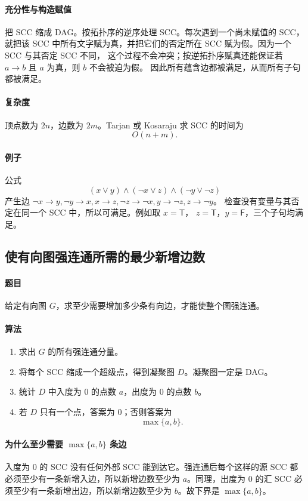 \documentclass[UTF8,openany,12pt]{ctexbook}
\theoremstyle{remark}
\begin{document}
\paragraph{充分性与构造赋值}
把 SCC 缩成 DAG。按拓扑序的逆序处理 SCC。每次遇到一个尚未赋值的 SCC，就把该 SCC
中所有文字赋为真，并把它们的否定所在 SCC 赋为假。因为一个 SCC 与其否定 SCC 不同，
这个过程不会冲突；按逆拓扑序赋真还能保证若 $a\to b$ 且 $a$ 为真，则 $b$ 不会被迫为假。
因此所有蕴含边都被满足，从而所有子句都被满足。

\paragraph{复杂度}
顶点数为 $2n$，边数为 $2m$。Tarjan 或 Kosaraju 求 SCC 的时间为
\[
  O(n+m).
\]

\paragraph{例子}
公式
\[
  (x\vee y)\wedge(\neg x\vee z)\wedge(\neg y\vee \neg z)
\]
产生边 $\neg x\to y,\neg y\to x,x\to z,\neg z\to\neg x,y\to\neg z,z\to\neg y$。
检查没有变量与其否定在同一个 SCC 中，所以可满足。例如取 $x=\mathsf{T}$，
$z=\mathsf{T}$，$y=\mathsf{F}$，三个子句均满足。

\subsection{使有向图强连通所需的最少新增边数}

\paragraph{题目}
给定有向图 $G$，求至少需要增加多少条有向边，才能使整个图强连通。

\paragraph{算法}
\begin{enumerate}
  \item 求出 $G$ 的所有强连通分量。
  \item 将每个 SCC 缩成一个超级点，得到凝聚图 $D$。凝聚图一定是 DAG。
  \item 统计 $D$ 中入度为 $0$ 的点数 $a$，出度为 $0$ 的点数 $b$。
  \item 若 $D$ 只有一个点，答案为 $0$；否则答案为
  \[
    \max\{a,b\}.
  \]
\end{enumerate}

\paragraph{为什么至少需要 $\max\{a,b\}$ 条边}
入度为 $0$ 的 SCC 没有任何外部 SCC 能到达它。强连通后每个这样的源 SCC 都必须至少有一条新增入边，所以新增边数至少为 $a$。同理，出度为 $0$ 的汇 SCC 必须至少有一条新增出边，所以新增边数至少为 $b$。故下界是 $\max\{a,b\}$。
\end{document}
